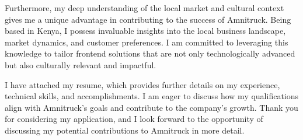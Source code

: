\documentclass[11pt, a4paper]{configuration}
\begin{document}
\begin{cvletter}
Furthermore, my deep understanding of the local market and cultural context gives me a unique advantage in contributing to the success of Amnitruck. Being based in Kenya, I possess invaluable insights into the local business landscape, market dynamics, and customer preferences. I am committed to leveraging this knowledge to tailor frontend solutions that are not only technologically advanced but also culturally relevant and impactful.

I have attached my resume, which provides further details on my experience, technical skills, and accomplishments. I am eager to discuss how my qualifications align with Amnitruck's goals and contribute to the company's growth. Thank you for considering my application, and I look forward to the opportunity of discussing my potential contributions to Amnitruck in more detail.

\end{cvletter}


\makeletterclosing
\end{document}
